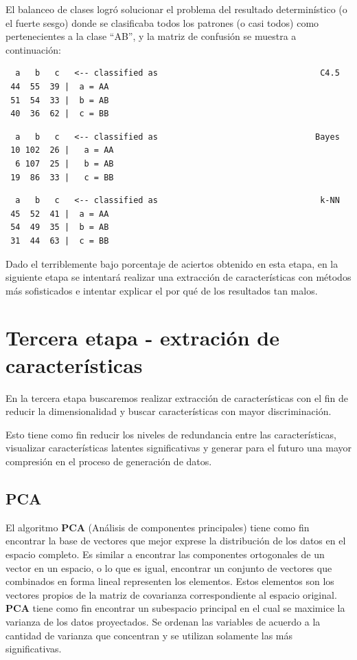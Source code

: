 \documentclass[12pt,a4paper,titlepage]{report}
\begin{document}
El balanceo de clases logró solucionar el problema del resultado determinístico (o el fuerte sesgo) donde se clasificaba todos los patrones (o casi todos) como pertenecientes a la clase ``AB'', y la matriz de confusión se muestra a continuación:
\vspace{-10pt}
\begin{lstlisting}
  a   b   c   <-- classified as									C4.5   
 44  55  39 |  a = AA
 51  54  33 |  b = AB
 40  36  62 |  c = BB
\end{lstlisting}
\vspace{-1cm}
\begin{lstlisting}
  a   b   c   <-- classified as								   Bayes
 10 102  26 |   a = AA
  6 107  25 |   b = AB
 19  86  33 |   c = BB
\end{lstlisting}
\vspace{-1cm}
\begin{lstlisting}
  a   b   c   <-- classified as									k-NN
 45  52  41 |  a = AA
 54  49  35 |  b = AB
 31  44  63 |  c = BB
\end{lstlisting}

Dado el terriblemente bajo porcentaje de aciertos obtenido en esta etapa, en la siguiente etapa se intentará realizar una extracción de características con métodos más sofisticados e intentar explicar el por qué de los resultados tan malos.

\section{Tercera etapa - extración de características}

En la tercera etapa buscaremos realizar extracción de características con el fin de reducir la dimensionalidad y  buscar características con mayor discriminación. 

Esto tiene como fin reducir los niveles de redundancia entre las características, visualizar características latentes significativas y generar para el futuro una mayor compresión en el proceso de generación de datos. 

\subsection{PCA}

El algoritmo \textbf{PCA} (Análisis de componentes principales) tiene como fin encontrar la base de vectores que mejor exprese la distribución de los datos en el espacio completo. Es similar a encontrar las componentes ortogonales de un vector en un espacio, o lo que es igual, encontrar un conjunto de vectores que combinados en forma lineal representen los elementos. Estos elementos son los vectores propios de la matriz de covarianza correspondiente al espacio original. \textbf{PCA} tiene como fin encontrar un subespacio principal en el cual se maximice la varianza de los datos proyectados. Se ordenan las variables de acuerdo a la cantidad de varianza que concentran y se utilizan solamente las más significativas.
\end{document}
